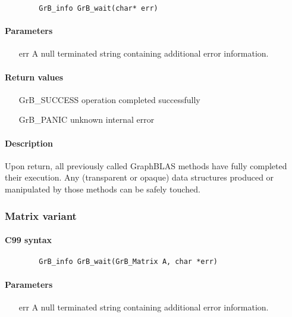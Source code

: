 \begin{verbatim}
        GrB_info GrB_wait(char* err)
\end{verbatim}

\paragraph{Parameters}
\begin{itemize}
\item[{\sf err}]     A null terminated string containing additional error
information.
\end{itemize}


\paragraph{Return values}
\begin{itemize}[leftmargin=2.1in]
\item[{\sf GrB\_SUCCESS}]	operation completed successfully
\item[{\sf GrB\_PANIC}]		unknown internal error
\end{itemize}

\paragraph{Description}

Upon return, all previously called GraphBLAS methods have fully completed their execution.
Any (transparent or opaque) data structures produced or manipulated by those methods can be safely touched.

\subsubsection{Matrix variant}

\paragraph{C99 syntax}

\begin{verbatim}
        GrB_info GrB_wait(GrB_Matrix A, char *err)
\end{verbatim}

\paragraph{Parameters}
\begin{itemize}
\item[{\sf err}]     A null terminated string containing additional error
information.
\end{itemize}

